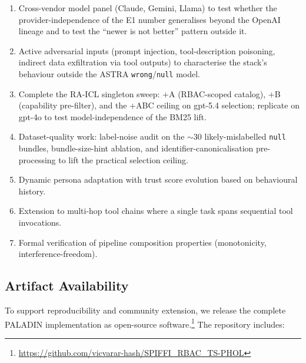 \documentclass[10pt,a4paper,twocolumn]{article}
\begin{document}
\begin{enumerate}
  \item Cross-vendor model panel (Claude, Gemini, Llama) to test whether the provider-independence of the E1 number generalises beyond the OpenAI lineage and to test the ``newer is not better'' pattern outside it.
  \item Active adversarial inputs (prompt injection, tool-description poisoning, indirect data exfiltration via tool outputs) to characterise the stack's behaviour outside the ASTRA \texttt{wrong}/\texttt{null} model.
  \item Complete the RA-ICL singleton sweep: +A (RBAC-scoped catalog), +B (capability pre-filter), and the +ABC ceiling on gpt-5.4 selection; replicate on gpt-4o to test model-independence of the BM25 lift.
  \item Dataset-quality work: label-noise audit on the $\sim 30$ likely-mislabelled \texttt{null} bundles, bundle-size-hint ablation, and identifier-canonicalisation pre-processing to lift the practical selection ceiling.
  \item Dynamic persona adaptation with trust score evolution based on behavioural history.
  \item Extension to multi-hop tool chains where a single task spans sequential tool invocations.
  \item Formal verification of pipeline composition properties (monotonicity, interference-freedom).
\end{enumerate}

\subsection{Artifact Availability}
\label{sec:artifacts}

To support reproducibility and community extension, we release the complete PALADIN implementation as open-source software.\footnote{\url{https://github.com/vicvarar-hash/SPIFFI_RBAC_TS-PHOL}} The repository includes:
\end{document}
